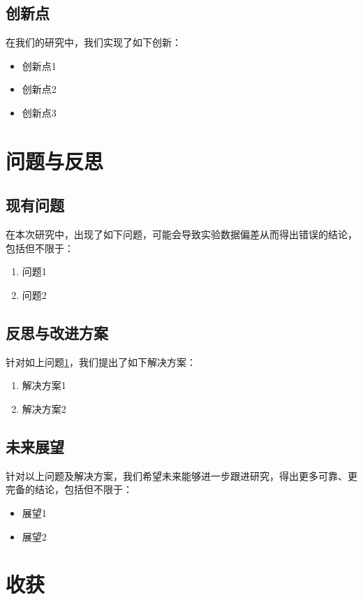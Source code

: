 \documentclass[12pt,a4paper]{ctexart}
\begin{document}
\subsection{创新点}
在我们的研究中，我们实现了如下创新：
\begin{itemize}
    \item 创新点1
    \item 创新点2
    \item 创新点3
\end{itemize}

\section{问题与反思}\label{sec:problem}
\subsection{现有问题}
在本次研究中，出现了如下问题，可能会导致实验数据偏差从而得出错误的结论，包括但不限于：
\begin{enumerate}
    \item 问题1
    \item 问题2
\end{enumerate}

\subsection{反思与改进方案}
针对如上问题\ref{sec:problem}，我们提出了如下解决方案：
\begin{enumerate}
    \item 解决方案1
    \item 解决方案2
\end{enumerate}

\subsection{未来展望}
针对以上问题及解决方案，我们希望未来能够进一步跟进研究，得出更多可靠、更完备的结论，包括但不限于：
\begin{itemize}
    \item 展望1
    \item 展望2
\end{itemize}

\section{收获}
\end{document}
